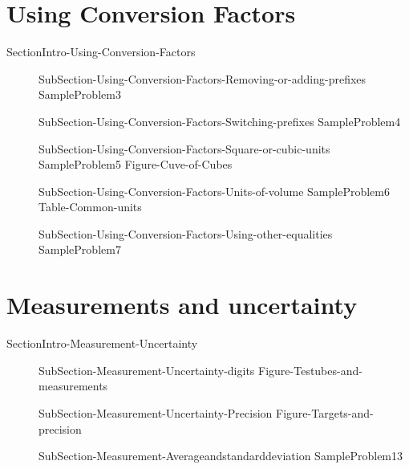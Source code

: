 \documentclass[main.tex]{subfiles}
\newcommand\chapterlabel{Ch-measurements}\setcounter{figurenewcounter}{0}\setcounter{tablenewcounter}{0}\setcounter{formulanewcounter}{0}
\begin{document}
\section{Using Conversion Factors}
{SectionIntro-Using-Conversion-Factors}
\sloppy\begin{description}
\item[]{SubSection-Using-Conversion-Factors-Removing-or-adding-prefixes}
{SampleProblem3}
\item[]{SubSection-Using-Conversion-Factors-Switching-prefixes}
{SampleProblem4}
\item[]{SubSection-Using-Conversion-Factors-Square-or-cubic-units}
{SampleProblem5}
{Figure-Cuve-of-Cubes}
\item[]{SubSection-Using-Conversion-Factors-Units-of-volume}
{SampleProblem6}
{Table-Common-units}
\item[]{SubSection-Using-Conversion-Factors-Using-other-equalities}
{SampleProblem7}
\end{description}

\section{Measurements and uncertainty}
{SectionIntro-Measurement-Uncertainty}
\sloppy\begin{description}
\item[]{SubSection-Measurement-Uncertainty-digits}
{Figure-Testubes-and-measurements}		
 \item[]{SubSection-Measurement-Uncertainty-Precision}
{Figure-Targets-and-precision}		
 \item[]{SubSection-Measurement-Averageandstandarddeviation}
 {SampleProblem13}
\end{description}
\end{document}
